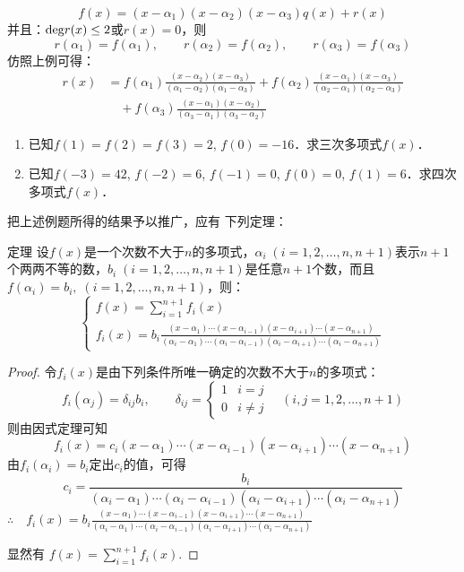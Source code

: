 \begin{solution}
\[f(x)=(x-\alpha_1)(x-\alpha_2)(x-\alpha_3)q(x)+r(x)\]
并且：${\rm deg}r(x)\le 2$或$r(x)=0$，则
\[r(\alpha_1)=f(\alpha_1),\qquad r(\alpha_2)=f(\alpha_2),\qquad r(\alpha_3)=f(\alpha_3)\]
 仿照上例可得：
 \[\begin{split}
     r(x)&=f(\alpha_1)\frac{(x-\alpha_2)(x-\alpha_3)}{(\alpha_1-\alpha_2)(\alpha_1-\alpha_3)} +f(\alpha_2)\frac{(x-\alpha_1)(x-\alpha_3)}{(\alpha_2-\alpha_1)(\alpha_2-\alpha_3)}
     \\
&\quad     +f(\alpha_3)\frac{(x-\alpha_1)(x-\alpha_2)}{(\alpha_3-\alpha_1)(\alpha_3-\alpha_2)}
 \end{split}\]
\end{solution}

\begin{ex}
\begin{enumerate}
    \item 已知$f(1)=f(2)=f(3)=2$, $f(0)=-16$．求三次多项式$f(x)$．
    \item 已知$f(-3)=42$, $f(-2)=6$, $f(-1)=0$, $f(0)=0$, $f(1)=6$．求四次多项式$f(x)$．
\end{enumerate} 
\end{ex}


把上述例题所得的结果予以推广，应有
下列定理：

\begin{blk}{定理}
    设$f(x)$是一个次数不大于$n$的多项式，$\alpha_i\; (i=1, 2,\ldots,n,n+1)$表示$n+1$个两两不等的数，$b_i\; (i=1, 2,\ldots,n,n+1)$是任意$n+1$个数，而且
$f (\alpha_i) =b_i,\; (i=1, 2,\ldots,n,n+1)$，则：
\[\begin{cases}
   f(x)=\sum^{n+1}_{i=1} f_i(x)\\
   f_i(x)=b_i\frac{(x-\alpha_1)\cdots(x-\alpha_{i-1})(x-\alpha_{i+1})\cdots (x-\alpha_{n+1})}{(\alpha_i-\alpha_1)\cdots(\alpha_i-\alpha_{i-1})(\alpha_i-\alpha_{i+1})\cdots (\alpha_i-\alpha_{n+1})}
\end{cases}\]
\end{blk}

\begin{proof}
令$f_i(x)$是由下列条件所唯一确定的次数不大于$n$的多项式：
\[f_i(\alpha_j)=\delta_{ij}b_i,\qquad \delta_{ij}=\begin{cases}
    1&i=j\\
    0&i\ne j
\end{cases}\quad (i,j=1,2,\ldots,n+1)\]
则由因式定理可知
\[f_i(x)=c_i(x-\alpha_1)\cdots(x-\alpha_{i-1})(x-\alpha_{i+1})\cdots (x-\alpha_{n+1})\]
由$f_i(\alpha_i)=b_i$定出$c_i$的值，可得
\[c_i=\frac{b_i}{(\alpha_i-\alpha_1)\cdots(\alpha_i-\alpha_{i-1})(\alpha_i-\alpha_{i+1})\cdots (\alpha_i-\alpha_{n+1})}\]
$\therefore\quad f_i(x)=b_i\frac{(x-\alpha_1)\cdots(x-\alpha_{i-1})(x-\alpha_{i+1})\cdots (x-\alpha_{n+1})}{(\alpha_i-\alpha_1)\cdots(\alpha_i-\alpha_{i-1})(\alpha_i-\alpha_{i+1})\cdots (\alpha_i-\alpha_{n+1})}$

显然有 $f(x)=\displaystyle\sum^{n+1}_{i=1} f_i(x)$.
\end{proof}

